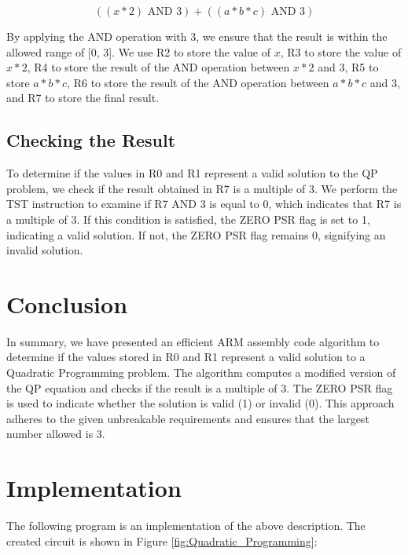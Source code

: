 \begin{equation}
    ((x * 2) \text{ AND } 3) + ((a * b * c) \text{ AND } 3)
\end{equation}

By applying the AND operation with 3, we ensure that the result is within the allowed range of [0, 3]. We use R2 to store the value of $x$, R3 to store the value of $x * 2$, R4 to store the result of the AND operation between $x * 2$ and 3, R5 to store $a * b * c$, R6 to store the result of the AND operation between $a * b * c$ and 3, and R7 to store the final result.

\subsection{Checking the Result}

To determine if the values in R0 and R1 represent a valid solution to the QP problem, we check if the result obtained in R7 is a multiple of 3. We perform the TST instruction to examine if R7 AND 3 is equal to 0, which indicates that R7 is a multiple of 3. If this condition is satisfied, the ZERO PSR flag is set to 1, indicating a valid solution. If not, the ZERO PSR flag remains 0, signifying an invalid solution.

\section{Conclusion}

In summary, we have presented an efficient ARM assembly code algorithm to determine if the values stored in R0 and R1 represent a valid solution to a Quadratic Programming problem. The algorithm computes a modified version of the QP equation and checks if the result is a multiple of 3. The ZERO PSR flag is used to indicate whether the solution is valid (1) or invalid (0). This approach adheres to the given unbreakable requirements and ensures that the largest number allowed is 3.



\section{Implementation}

The following program is an implementation of the above description. The created circuit is shown in Figure \ref{fig:Quadratic_Programming}:

